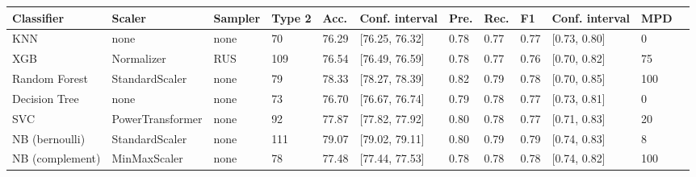 \begin{table}[]
\begin{adjustwidth}{-3cm}{}

\begin{footnotesize}
\begin{tabular}{|l|l|l|l|l|l|l|l|l|l|l|l|}
\hline
\textbf{Classifier} & \textbf{Scaler}   & \textbf{Sampler}   & \textbf{Type 2} & \textbf{Acc.} & \textbf{Conf. interval} & \textbf{Pre.} & \textbf{Rec.} & \textbf{F1} & \textbf{Conf. interval} & \textbf{MPD} \\ \hline
KNN                                & none                 & none               & 70              & 76.29         & {[}76.25, 76.32{]}   & 0.78           & 0.77        & 0.77         & {[}0.73, 0.80{]}      & 0                                                    \\ \hline
XGB                                & Normalizer           & RUS 				   & 109             & 76.54         & {[}76.49, 76.59{]}    & 0.78           & 0.77        & 0.76         & {[}0.70, 0.82{]}      & 75                                                   \\ \hline
Random Forest                      & StandardScaler       & none               & 79              & 78.33         & {[}78.27, 78.39{]}   & 0.82           & 0.79        & 0.78         & {[}0.70, 0.85{]}     & 100                                                  \\ \hline
Decision Tree                      & none                 & none               & 73              & 76.70         & {[}76.67, 76.74{]}    & 0.79           & 0.78        & 0.77         & {[}0.73, 0.81{]}     & 0                                                    \\ \hline
SVC                                & PowerTransformer     & none               & 92              & 77.87         & {[}77.82, 77.92{]}   & 0.80           & 0.78        & 0.77         & {[}0.71, 0.83{]}     & 20                                                   \\ \hline
NB (bernoulli)            & StandardScaler       & none               & 111             & 79.07         & {[}79.02, 79.11{]}   & 0.80           & 0.79        & 0.79         & {[}0.74, 0.83{]}      & 8                                                    \\ \hline
NB (complement)           & MinMaxScaler         & none               & 78              & 77.48         & {[}77.44, 77.53{]}   & 0.78            & 0.78         & 0.78         & {[}0.74, 0.82{]}     & 100                                                  \\ \hline

\end{tabular}
\end{footnotesize}
\end{adjustwidth}
\end{table}
